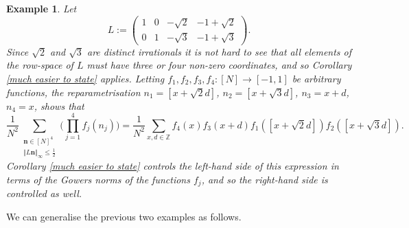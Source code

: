 \documentclass[12pt,a4paper,twoside,reqno]{amsart}
\newtheorem{Example}[Theorem]{Example}
\numberwithin{equation}{section}
\begin{document}
\begin{Example}
\label{four term irrational AP}
\emph{Let 
\begin{equation}
\label{the equation giving an example of L}
L := \left(\begin{matrix}
1 & 0 & -\sqrt{2} & -1 + \sqrt{2} \\
0 & 1 & -\sqrt{3} & -1 + \sqrt{3}
\end{matrix} \right).
\end{equation} Since $\sqrt{2}$ and $\sqrt{3}$ are distinct irrationals it is not hard to see that all elements of the row-space of $L$ must have three or four non-zero coordinates, and so Corollary \ref{much easier to state} applies. Letting $f_1,f_2,f_3,f_4:[N] \longrightarrow [-1,1]$ be arbitrary functions, the reparametrisation $n_1 = [x + \sqrt{2} d]$, $n_2 = [x + \sqrt{3} d]$, $n_3 = x + d$, $n_4 = x$, shows that} \[\frac{1}{N^2}\sum\limits_{\substack{\mathbf{n} \in [N]^4 \\ \Vert L \mathbf{n} \Vert_\infty \leqslant \frac{1}{2}}} \Big( \prod\limits_{j=1}^4 f_j(n_j) \Big) = \frac{1}{N^2}\sum\limits_{x,d\in \mathbb{Z}} f_4(x) f_3(x+d) f_1([x+\sqrt{2}d]) f_2([ x+\sqrt{3}d]).\]
\emph{Corollary \ref{much easier to state} controls the left-hand side of this expression in terms of the Gowers norms of the functions $f_j$, and so the right-hand side is controlled as well.}
\end{Example}

We can generalise the previous two examples as follows. 
\end{document}
